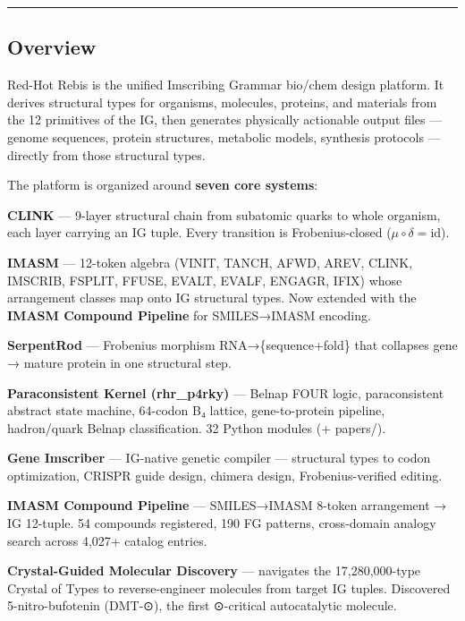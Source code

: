 \begin{center}\rule{0.5\linewidth}{0.5pt}\end{center}

\hypertarget{overview}{%
\subsection{Overview}\label{overview}}

Red-Hot Rebis is the unified Imscribing Grammar bio/chem design
platform. It derives structural types for organisms, molecules,
proteins, and materials from the 12 primitives of the IG, then generates
physically actionable output files --- genome sequences, protein
structures, metabolic models, synthesis protocols --- directly from
those structural types.

The platform is organized around \textbf{seven core systems}:

\textbf{CLINK} --- 9-layer structural chain from subatomic quarks to
whole organism, each layer carrying an IG tuple. Every transition is
Frobenius-closed (\(\mu\circ\delta=\text{id}\)).

\textbf{IMASM} --- 12-token algebra (VINIT, TANCH, AFWD, AREV, CLINK,
IMSCRIB, FSPLIT, FFUSE, EVALT, EVALF, ENGAGR, IFIX) whose arrangement
classes map onto IG structural types. Now extended with the
\textbf{IMASM Compound Pipeline} for SMILES→IMASM encoding.

\textbf{SerpentRod} --- Frobenius morphism RNA→\{sequence+fold\} that
collapses gene → mature protein in one structural step.

\textbf{Paraconsistent Kernel (rhr\_p4rky)} --- Belnap FOUR logic,
paraconsistent abstract state machine, 64-codon B₄ lattice,
gene-to-protein pipeline, hadron/quark Belnap classification. 32 Python
modules (+ papers/).

\textbf{Gene Imscriber} --- IG-native genetic compiler --- structural
types to codon optimization, CRISPR guide design, chimera design,
Frobenius-verified editing.

\textbf{IMASM Compound Pipeline} --- SMILES→IMASM 8-token arrangement →
IG 12-tuple. 54 compounds registered, 190 FG patterns, cross-domain
analogy search across 4,027+ catalog entries.

\textbf{Crystal-Guided Molecular Discovery} --- navigates the
17,280,000-type Crystal of Types to reverse-engineer molecules from
target IG tuples. Discovered 5-nitro-bufotenin (DMT-⊙), the first
⊙-critical autocatalytic molecule.

